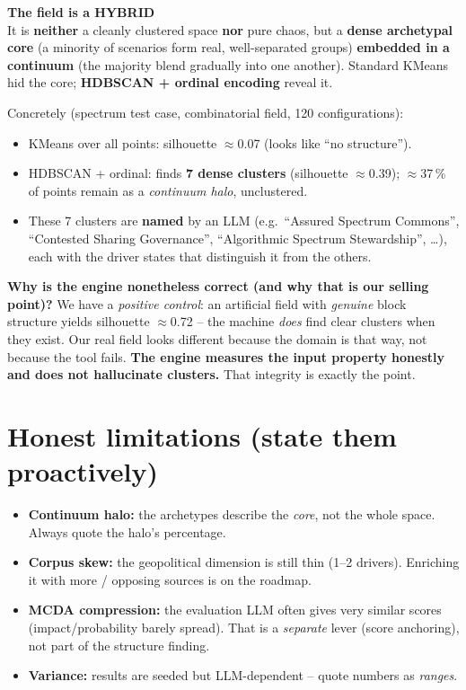 \documentclass[11pt,a4paper]{article}
\newcommand{\callout}[3]{\par\smallskip\noindent
  \colorbox{#1}{\parbox{\dimexpr\linewidth-2\fboxsep\relax}{%
  \textbf{#2}\\[2pt]#3}}\par\smallskip}
\newcommand{\key}[2]{\callout{keybg}{#1}{#2}}
\begin{document}
\key{The field is a HYBRID}{It is \textbf{neither} a cleanly clustered space \textbf{nor} pure chaos, but a
\textbf{dense archetypal core} (a minority of scenarios form real, well-separated groups) \textbf{embedded
in a continuum} (the majority blend gradually into one another). Standard KMeans hid the core;
\textbf{HDBSCAN + ordinal encoding} reveal it.}

Concretely (spectrum test case, combinatorial field, 120 configurations):
\begin{itemize}
  \item KMeans over all points: silhouette $\approx$0.07 (looks like \enquote{no structure}).
  \item HDBSCAN + ordinal: finds \textbf{7 dense clusters} (silhouette $\approx$0.39); $\approx$37\,\% of
  points remain as a \emph{continuum halo}, unclustered.
  \item These 7 clusters are \textbf{named} by an LLM (e.g.\ \enquote{Assured Spectrum Commons},
  \enquote{Contested Sharing Governance}, \enquote{Algorithmic Spectrum Stewardship}, \dots), each with the
  driver states that distinguish it from the others.
\end{itemize}

\textbf{Why is the engine nonetheless correct (and why that is our selling point)?} We have a
\emph{positive control}: an artificial field with \emph{genuine} block structure yields silhouette
$\approx$0.72 -- the machine \emph{does} find clear clusters when they exist. Our real field looks
different because the domain is that way, not because the tool fails. \textbf{The engine measures the input
property honestly and does not hallucinate clusters.} That integrity is exactly the point.

\section{Honest limitations (state them proactively)}
\begin{itemize}
  \item \textbf{Continuum halo:} the archetypes describe the \emph{core}, not the whole space. Always quote
  the halo's percentage.
  \item \textbf{Corpus skew:} the geopolitical dimension is still thin (1--2 drivers). Enriching it with
  more / opposing sources is on the roadmap.
  \item \textbf{MCDA compression:} the evaluation LLM often gives very similar scores (impact/probability
  barely spread). That is a \emph{separate} lever (score anchoring), not part of the structure finding.
  \item \textbf{Variance:} results are seeded but LLM-dependent -- quote numbers as \emph{ranges}.
\end{itemize}
\end{document}

